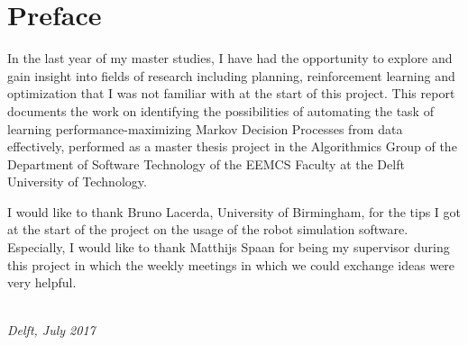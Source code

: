 \chapter*{Preface}


In the last year of my master studies, I have had the opportunity to explore and gain insight into fields of research including planning, reinforcement learning and optimization that I was not familiar with at the start of this project.
This report documents the work on identifying the possibilities of automating the task of learning performance-maximizing Markov Decision Processes from data effectively, performed as a master thesis project in the Algorithmics Group of the Department of Software Technology of the EEMCS Faculty at the Delft University of Technology.

I would like to thank Bruno Lacerda, University of Birmingham, for the tips I got at the start of the project on the usage of the robot simulation software.
Especially, I would like to thank Matthijs Spaan for being my supervisor during this project in which the weekly meetings in which we could exchange ideas were very helpful.

\begin{flushright}
{\makeatletter\itshape
    \@author \\
    Delft, July 2017
\makeatother}
\end{flushright}

%
\vspace{12pt}
\noindent{}
%